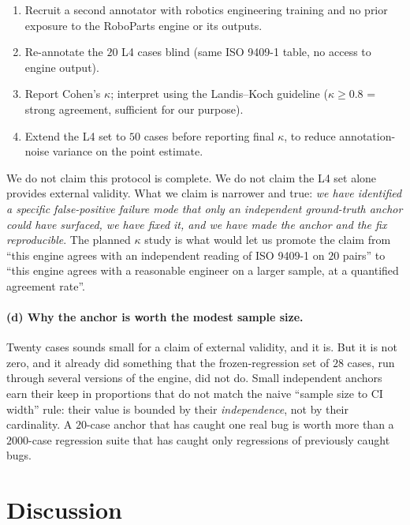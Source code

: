 \documentclass[11pt,twocolumn]{article}
\begin{document}
\begin{enumerate}[nosep]
\item Recruit a second annotator with robotics engineering training
and no prior exposure to the RoboParts engine or its outputs.
\item Re-annotate the $20$ L4 cases blind (same ISO 9409-1 table,
no access to engine output).
\item Report Cohen's $\kappa$; interpret using the Landis--Koch
guideline ($\kappa \geq 0.8$ = strong agreement, sufficient for our
purpose).
\item Extend the L4 set to $50$ cases before reporting final
$\kappa$, to reduce annotation-noise variance on the point estimate.
\end{enumerate}

We do not claim this protocol is complete. We do not claim the L4
set alone provides external validity. What we claim is narrower and
true: \emph{we have identified a specific false-positive failure mode
that only an independent ground-truth anchor could have surfaced,
we have fixed it, and we have made the anchor and the fix
reproducible}. The planned $\kappa$ study is what would let us
promote the claim from ``this engine agrees with an independent
reading of ISO 9409-1 on $20$ pairs'' to ``this engine agrees with a
reasonable engineer on a larger sample, at a quantified agreement
rate''.

\paragraph{(d) Why the anchor is worth the modest sample size.}
Twenty cases sounds small for a claim of external validity, and it
is. But it is not zero, and it already did something that the
frozen-regression set of $28$ cases, run through several versions of
the engine, did not do. Small independent anchors earn their keep in
proportions that do not match the naive ``sample size to CI width''
rule: their value is bounded by their \emph{independence}, not by
their cardinality. A $20$-case anchor that has caught one real bug is
worth more than a $2000$-case regression suite that has caught only
regressions of previously caught bugs.

\section{Discussion}
\end{document}
